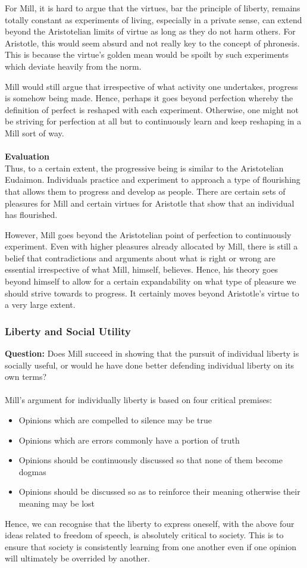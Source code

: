 \documentclass[12pt, letterpaper]{article}
\begin{document}
For Mill, it is hard to argue that the virtues, bar the principle of liberty, remains totally constant as experiments of living, especially in a private sense, can extend beyond the Aristotelian limits of virtue as long as they do not harm others. For Aristotle, this would seem absurd and not really key to the concept of phronesis. This is because the virtue's golden mean would be spoilt by such experiments which deviate heavily from the norm.

Mill would still argue that irrespective of what activity one undertakes, progress is somehow being made. Hence, perhaps it goes beyond perfection whereby the definition of perfect is reshaped with each experiment. Otherwise, one might not be striving for perfection at all but to continuously learn and keep reshaping in a Mill sort of way.
\\\\
\textbf{Evaluation}\\
Thus, to a certain extent, the progressive being is similar to the Aristotelian Eudaimon. Individuals practice and experiment to approach a type of flourishing that allows them to progress and develop as people. There are certain sets of pleasures for Mill and certain virtues for Aristotle that show that an individual has flourished.

However, Mill goes beyond the Aristotelian point of perfection to continuously experiment. Even with higher pleasures already allocated by Mill, there is still a belief that contradictions and arguments about what is right or wrong are essential irrespective of what Mill, himself, believes. Hence, his theory goes beyond himself to allow for a certain expandability on what type of pleasure we should strive towards to progress. It certainly moves beyond Aristotle's virtue to a very large extent.


\subsubsection{Liberty and Social Utility}
\textbf{Question:} Does Mill succeed in showing that the pursuit of individual liberty is socially useful, or would he have done better defending individual liberty on its own terms?\\\\
Mill's argument for individually liberty is based on four critical premises:
\begin{itemize}
	\item Opinions which are compelled to silence may be true
	\item Opinions which are errors commonly have a portion of truth
	\item Opinions should be continuously discussed so that none of them become dogmas
	\item Opinions should be discussed so as to reinforce their meaning otherwise their meaning may be lost
\end{itemize}
Hence, we can recognise that the liberty to express oneself, with the above four ideas related to freedom of speech, is absolutely critical to society. This is to ensure that society is consistently learning from one another even if one opinion will ultimately be overrided by another.
\end{document}
